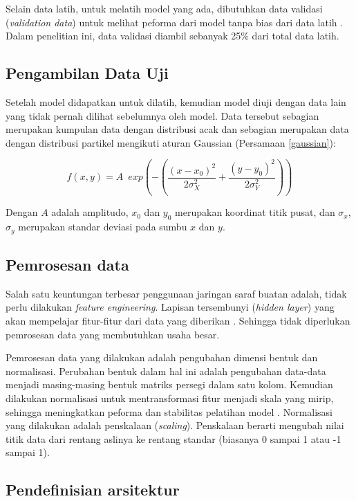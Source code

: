 Selain data latih, untuk melatih model yang ada, dibutuhkan data validasi (\emph{validation data}) untuk melihat peforma dari model tanpa bias dari data latih \citep{jason_brownlee_2017}. Dalam penelitian ini, data validasi diambil sebanyak 25\% dari total data latih.

\subsection{Pengambilan Data Uji}
Setelah model didapatkan untuk dilatih, kemudian model diuji dengan data lain yang tidak pernah dilihat sebelumnya oleh model. Data tersebut sebagian merupakan kumpulan data dengan distribusi acak dan sebagian merupakan data dengan distribusi partikel mengikuti aturan Gaussian (Persamaan \eqref{gaussian}):

\begin{equation}\label{gaussian}
    f(x,y) = A \enspace exp \left(-\left(\frac{(x-x_0)^2}{2 \sigma^2_X} + \frac{(y-y_0)^2}{2 \sigma^2_Y}\right)\right)
\end{equation}

Dengan $A$ adalah amplitudo, $x_0$ dan $y_0$ merupakan koordinat titik pusat, dan $\sigma_x$, $\sigma_y$ merupakan standar deviasi pada sumbu $x$ dan $y$.

\subsection{Pemrosesan data}
Salah satu keuntungan terbesar penggunaan jaringan saraf buatan adalah, tidak perlu dilakukan \emph{feature engineering}. Lapisan tersembunyi (\emph{hidden layer}) yang akan mempelajar fitur-fitur dari data yang diberikan \citep{denny2015}. Sehingga tidak diperlukan pemrosesan data yang membutuhkan usaha besar.

Pemrosesan data yang dilakukan adalah pengubahan dimensi bentuk dan normalisasi. Perubahan bentuk dalam hal ini adalah pengubahan data-data menjadi masing-masing bentuk matriks persegi dalam satu kolom. Kemudian dilakukan normalisasi untuk mentransformasi fitur menjadi skala yang mirip, sehingga meningkatkan peforma dan stabilitas pelatihan model \citep{google_2022}. Normalisasi yang dilakukan adalah penskalaan (\emph{scaling}). Penskalaan berarti mengubah nilai titik data dari rentang aslinya ke rentang standar (biasanya 0 sampai 1 atau -1 sampai 1).

\subsection{Pendefinisian arsitektur}

